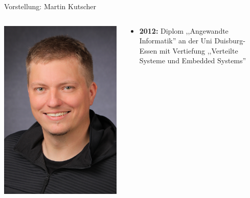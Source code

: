 \begin{frame}{Vorstellung: Martin Kutscher}
    \begin{columns}
        \begin{column}{.2\textwidth}
            \begin{center}
                \includegraphics[width=\textwidth]{1-grundlagen/img/dozent_kutscher}
            \end{center}
        \end{column}
        \begin{column}{.8\textwidth}
            \begin{itemize}
                \item \textbf{2012:} Diplom ,,Angewandte Informatik''  an der Uni Duisburg-Essen
                mit Vertiefung ,,Verteilte Systeme und Embedded Systems''


\end{itemize}
\end{column}
\end{columns}
\end{frame}
